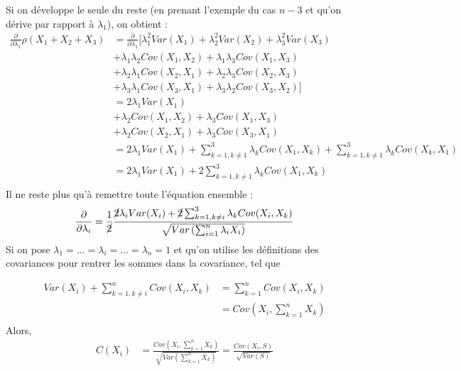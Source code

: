 Si on développe le  seule du reste (en prenant l'exemple du cas $n-3$ et qu'on dérive par rapport à $\lambda_1$), on obtient : 
\begin{align*}
\frac{\partial}{\partial \lambda_1} \rho(X_1 + X_2 + X_3) & = \frac{\partial}{\partial \lambda_1} \Big[ \lambda_1^2 Var(X_1) + \lambda_2^2 Var(X_2) + \lambda_3^2 Var(X_3) \\
	& + \lambda_1 \lambda_2 Cov(X_1, X_2) + \lambda_1 \lambda_3 Cov(X_1, X_3) \\
	& + \lambda_2 \lambda_1 Cov(X_2, X_1) + \lambda_2 \lambda_3 Cov(X_2, X_3) \\
	& + \lambda_3 \lambda_1 Cov(X_3, X_1) + \lambda_3 \lambda_2 Cov(X_3, X_2) \Big] \\
	& = 2 \lambda_1 Var(X_1) \\
	& + \lambda_2 Cov(X_1, X_2) + \lambda_3 Cov(X_1, X_3) \\	
	& + \lambda_2 Cov(X_2, X_1) + \lambda_3 Cov(X_3, X_1) \\
	& = 2 \lambda_1 Var(X_1) + \sum_{k=1, k \neq 1}^{3} \lambda_k Cov(X_1, X_k) + \sum_{k=1, k \neq 1}^{3} \lambda_k Cov(X_k, X_1) \\
	& = 2 \lambda_1 Var(X_1) + 2 \sum_{k=1, k \neq 1}^{3} \lambda_k Cov(X_1, X_k) \\
\end{align*}
Il ne reste plus qu'à remettre toute l'équation ensemble : 
\begin{align*}
\frac{\partial}{\partial \lambda_i} & = \frac{1}{\cancel{2}} \frac{\cancel{2} \lambda_i Var(X_i) + \cancel{2} \sum_{k=1, k \neq i}^{3} \lambda_k Cov(X_i, X_k)}{\sqrt{Var \left( \sum_{i=1}^{n} \lambda_i X_i \right)}} \\
\end{align*}
Si on pose $\lambda_1 = ... = \lambda_i = ... = \lambda_n = 1$ et qu'on utilise les définitions des covariances pour rentrer les sommes dans la covariance, tel que

\begin{align*}
Var(X_i) + \sum_{k=1, k \neq i}^{n} Cov(X_i, X_k) & = \sum_{k=1}^{n} Cov(X_i, X_k) \\
	& = Cov \left( X_i, \sum_{k=1}^{n} X_k \right) \\
\end{align*}
Alors,
\begin{align*}
C(X_i)	& = \frac{Cov \left( X_i, \sum_{k=1}^{n} X_k   \right)}{\sqrt{Var \left(\sum_{k=1}^{n} X_k \right)}} = \frac{Cov( X_i, S)}{\sqrt{Var (S)}}
\end{align*}


